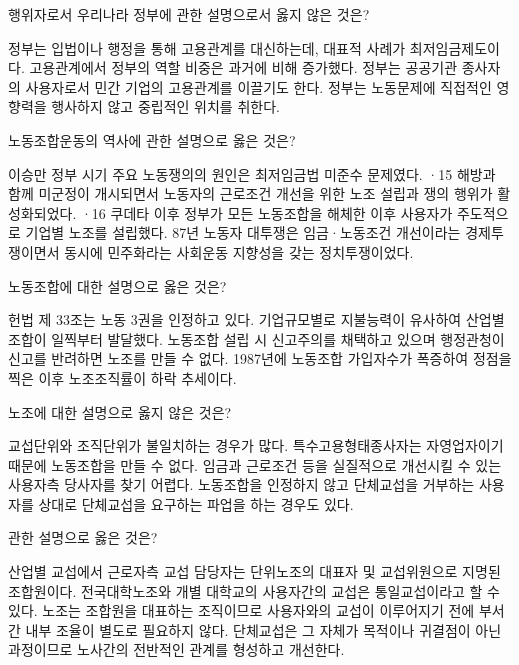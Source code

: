 \documentclass[11pt,]{exam} %
\begin{document}
\begin{questions}
 행위자로서 우리나라 정부에 관한 설명으로서 옳지 않은 것은?
    \begin{choices}
    \choice\relax 정부는 입법이나 행정을 통해 고용관계를 대신하는데, 대표적 사례가 최저임금제도이다.
    \choice\relax 고용관계에서 정부의 역할 비중은 과거에 비해 증가했다.
    \choice\relax 정부는 공공기관 종사자의 사용자로서 민간 기업의 고용관계를 이끌기도 한다.
    \CorrectChoice\relax 정부는 노동문제에 직접적인 영향력을 행사하지 않고 중립적인 위치를 취한다.
    \end{choices}

 노동조합운동의 역사에 관한 설명으로 옳은 것은?
    \begin{choices}
    \choice\relax 이승만 정부 시기 주요 노동쟁의의 원인은 최저임금법 미준수 문제였다.
    \choice{}·15 해방과 함께 미군정이 개시되면서 노동자의 근로조건 개선을 위한 노조 설립과 쟁의 행위가 활성화되었다.
    \choice{}·16 쿠데타 이후 정부가 모든 노동조합을 해체한 이후 사용자가 주도적으로 기업별 노조를 설립했다.
    \CorrectChoice\relax 87년 노동자 대투쟁은 임금·노동조건 개선이라는 경제투쟁이면서 동시에 민주화라는 사회운동 지향성을 갖는 정치투쟁이었다.
    \end{choices}

 노동조합에 대한 설명으로 옳은 것은?
    \begin{choices}
    \CorrectChoice\relax 헌법 제 33조는 노동 3권을 인정하고 있다.
    \choice\relax 기업규모별로 지불능력이 유사하여 산업별 조합이 일찍부터 발달했다.
    \choice\relax 노동조합 설립 시 신고주의를 채택하고 있으며 행정관청이 신고를 반려하면 노조를 만들 수 없다.
    \choice\relax 1987년에 노동조합 가입자수가 폭증하여 정점을 찍은 이후 노조조직률이 하락 추세이다.
    \end{choices}

 노조에 대한 설명으로 옳지 않은 것은?
    \begin{choices}
    \choice\relax 교섭단위와 조직단위가 불일치하는 경우가 많다.
    \CorrectChoice\relax 특수고용형태종사자는 자영업자이기 때문에 노동조합을 만들 수 없다.
    \choice\relax 임금과 근로조건 등을 실질적으로 개선시킬 수 있는 사용자측 당사자를 찾기 어렵다.
    \choice\relax 노동조합을 인정하지 않고 단체교섭을 거부하는 사용자를 상대로 단체교섭을 요구하는 파업을 하는 경우도 있다.
    \end{choices}

 관한 설명으로 옳은 것은?
    \begin{choices}
    \choice\relax 산업별 교섭에서 근로자측 교섭 담당자는 단위노조의 대표자 및 교섭위원으로 지명된 조합원이다.
    \choice\relax 전국대학노조와 개별 대학교의 사용자간의 교섭은 통일교섭이라고 할 수 있다.
    \choice\relax 노조는 조합원을 대표하는 조직이므로 사용자와의 교섭이 이루어지기 전에 부서간 내부 조율이 별도로 필요하지 않다.
    \CorrectChoice\relax 단체교섭은 그 자체가 목적이나 귀결점이 아닌 과정이므로 노사간의 전반적인 관계를 형성하고 개선한다.
    \end{choices}


\end{questions}
\end{document}
